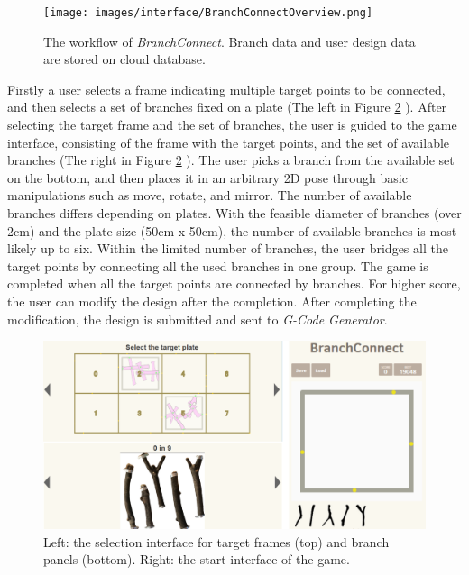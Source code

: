 \begin{figure}[ht]
  \begin{center}
    \texttt{[image: images/interface/BranchConnectOverview.png]}
    \caption{The workflow of \textit{BranchConnect}. Branch data and user design data are stored on cloud database.}
    \label{fig:game_flowchart}
  \end{center}
\end{figure}

Firstly a user selects a frame indicating multiple target points to be connected, and then selects a set of branches fixed on a plate (The left in Figure \ref{fig:game_interface} ).
After selecting the target frame and the set of branches, the user is guided to the game interface, consisting of the frame with the target points, and the set of available branches (The right in Figure \ref{fig:game_interface} ).
The user picks a branch from the available set on the bottom, and then places it in an arbitrary 2D pose through basic manipulations such as move, rotate, and mirror.
The number of available branches differs depending on plates.
With the feasible diameter of branches (over 2cm) and the plate size (50cm x 50cm), the number of available branches is most likely up to six.
Within the limited number of branches, the user bridges all the target points by connecting all the used branches in one group.
The game is completed when all the target points are connected by branches.
For higher score, the user can modify the design after the completion.
After completing the modification, the design is submitted and sent to \textit{G-Code Generator}.

\begin{figure}[H]
  \begin{center}
    \includegraphics[width = 0.4\paperwidth]{images/interface/game_interface.png}
    \caption{Left: the selection interface for target frames (top) and branch panels (bottom). Right: the start interface of the game.}
    \label{fig:game_interface}
  \end{center}
\end{figure}
%
